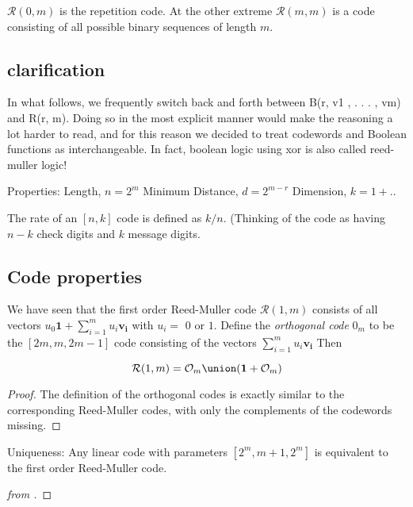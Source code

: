 \documentclass{article}
\newcommand{\RM}[2]{\ensuremath{\mathcal{R}(#1,#2)}}
\newcommand{\rem}{Reed-Muller}
\newcommand{\V}[1]{\ensuremath{\mathbf{#1}}}
\theoremstyle{plain}
\begin{document}
$\RM{0}{m} $ is the repetition code. At the other extreme $\RM{m}{m}$ is a code consisting of all possible binary sequences of length $m$.


\subsection{clarification}

In what follows, we frequently switch back and forth between 
B(r, {v1 , . . . , vm}) 
and 
R(r, m). Doing so in the most explicit manner would make the reasoning a 
lot harder to read, and for this reason we decided to treat codewords and Boolean 
functions as interchangeable.
In fact, boolean logic using xor is also called reed-muller logic! \cite{rmlogic}

Properties:
Length, $n = 2^m$
Minimum Distance, $d = 2^{m-r}$
Dimension, $k=1+..$

The rate of an $[n, k]$ code is deﬁned as $k/n$. 
(Thinking of the code as having $n − k$ check digits and $k$ message 
digits.


\subsection{Code properties}
\label{properies}

We have seen that the first order Reed-Muller code $\RM{1}{m}$ consists of all vectors $u_0\V{1} + \sum_{i=1}^m{u_i\V{v_i}} $ with $u_i=$ $0$ or $1$. 
Define the \emph{orthogonal code} $\mathcal{0}_m$ to be the $[2m, m, 2m−1]$ code consisting of the vectors $ \sum_{i=1}^m{u_i\V{v_i}} $
Then
\begin{theorem}
  \begin{equation*}
  \RM{1}{m} = \mathcal{O}_m \union (\V{1} + \mathcal{O}_m) 
\end{equation*}
\begin{proof}
  The definition of the orthogonal codes is exactly similar to the corresponding \rem{} codes, with only the complements of the codewords missing. 
\end{proof}
\end{theorem}

 
\begin{theorem}
  Uniqueness: Any linear code with parameters $[2^m, m+1, 2^{m} ]$ is equivalent to the first order \rem{} code.
\begin{proof}[from \cite{uniq}]
  
\end{proof}
\end{theorem}
\end{document}
